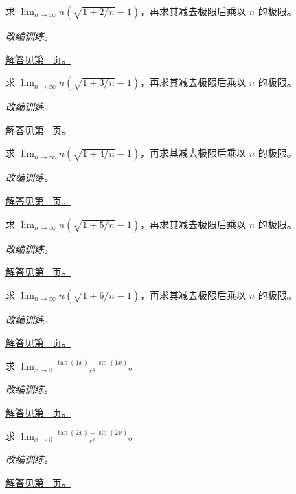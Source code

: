 \documentclass[UTF8,12pt,a4paper,fontset=fandol]{ctexart}
\begin{document}
\begin{example}[缩放后的根式增量]\label{ex:c5q8}
求 $\displaystyle\lim_{n\to\infty}n\left(\sqrt{1+2/n}-1\right)$，再求其减去极限后乘以 $n$ 的极限。
\par\textit{改编训练。}\par\hyperref[ans:c5q8]{解答见第~\pageref{ans:c5q8} 页。}
\end{example}
\begin{example}[缩放后的根式增量]\label{ex:c5q9}
求 $\displaystyle\lim_{n\to\infty}n\left(\sqrt{1+3/n}-1\right)$，再求其减去极限后乘以 $n$ 的极限。
\par\textit{改编训练。}\par\hyperref[ans:c5q9]{解答见第~\pageref{ans:c5q9} 页。}
\end{example}
\begin{example}[缩放后的根式增量]\label{ex:c5q10}
求 $\displaystyle\lim_{n\to\infty}n\left(\sqrt{1+4/n}-1\right)$，再求其减去极限后乘以 $n$ 的极限。
\par\textit{改编训练。}\par\hyperref[ans:c5q10]{解答见第~\pageref{ans:c5q10} 页。}
\end{example}
\begin{example}[缩放后的根式增量]\label{ex:c5q11}
求 $\displaystyle\lim_{n\to\infty}n\left(\sqrt{1+5/n}-1\right)$，再求其减去极限后乘以 $n$ 的极限。
\par\textit{改编训练。}\par\hyperref[ans:c5q11]{解答见第~\pageref{ans:c5q11} 页。}
\end{example}
\begin{example}[缩放后的根式增量]\label{ex:c5q12}
求 $\displaystyle\lim_{n\to\infty}n\left(\sqrt{1+6/n}-1\right)$，再求其减去极限后乘以 $n$ 的极限。
\par\textit{改编训练。}\par\hyperref[ans:c5q12]{解答见第~\pageref{ans:c5q12} 页。}
\end{example}
\begin{example}[三角函数差的三阶项]\label{ex:c5q13}
求 $\displaystyle\lim_{x\to0}\frac{\tan(1x)-\sin(1x)}{x^3}$。
\par\textit{改编训练。}\par\hyperref[ans:c5q13]{解答见第~\pageref{ans:c5q13} 页。}
\end{example}
\begin{example}[三角函数差的三阶项]\label{ex:c5q14}
求 $\displaystyle\lim_{x\to0}\frac{\tan(2x)-\sin(2x)}{x^3}$。
\par\textit{改编训练。}\par\hyperref[ans:c5q14]{解答见第~\pageref{ans:c5q14} 页。}
\end{example}
\end{document}
